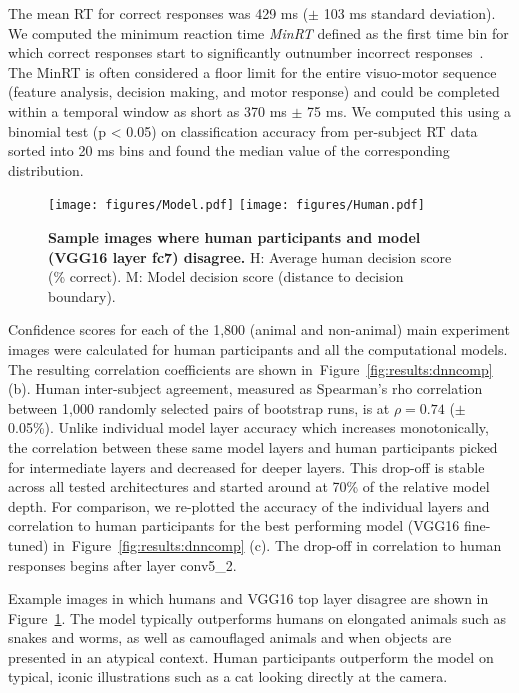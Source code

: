 \documentclass{article}
\begin{document}
\clearpage


The mean RT for correct responses was 429 ms ($\pm$ 103 ms standard deviation). We computed the minimum reaction time \emph{MinRT} defined as the first time bin for which correct responses start to significantly outnumber incorrect responses~\citep{Fabre-Thorpe2011}. The MinRT is often considered a floor limit for the entire visuo-motor sequence (feature analysis, decision making, and motor response) and could be completed within a temporal window as short as 370 ms $\pm$ 75 ms. We computed this using a binomial test (p < 0.05) on classification accuracy from per-subject RT data sorted into 20 ms bins and found the median value of the corresponding distribution. 


\begin{figure}[t!]
  \begin{center}
    \texttt{[image: figures/Model.pdf]}
    \texttt{[image: figures/Human.pdf]}
    \caption[Humans versus model disagreement example images]{\textbf{Sample images where human participants and model (VGG16 layer fc7) disagree.} H: Average human decision score (\% correct). M: Model decision score (distance to decision boundary).}
    \label{fig:results:exampleimg}
  \end{center}
\end{figure}

Confidence scores for each of the 1,800 (animal and non-animal) main experiment images were calculated for human participants and all the computational models. The resulting correlation coefficients are shown in~Figure~\ref{fig:results:dnncomp} (b). Human inter-subject agreement, measured as Spearman's rho correlation between 1,000 randomly selected pairs of bootstrap runs, is at $\rho=0.74$ ($\pm$ 0.05\%). Unlike individual model layer accuracy which increases monotonically, the correlation between these same model layers and human participants picked for intermediate layers and decreased for deeper layers. This drop-off is stable across all tested architectures and started around at 70\% of the relative model depth. For comparison, we re-plotted the accuracy of the individual layers and correlation to human participants for the  best performing model (VGG16 fine-tuned) in~Figure~\ref{fig:results:dnncomp} (c). The drop-off in correlation to human responses begins after layer conv5\_2.


Example images in which humans and VGG16 top layer disagree are shown in Figure~\ref{fig:results:exampleimg}. The model typically outperforms humans on elongated animals such as snakes and worms, as well as camouflaged animals and when objects are presented in an atypical context. Human participants outperform the model on typical, iconic illustrations such as a cat looking directly at the camera.
\end{document}
